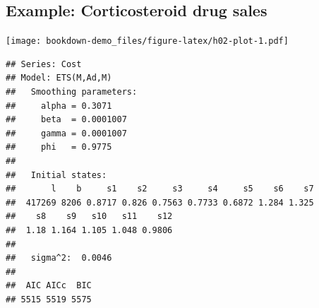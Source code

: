 \documentclass[]{book}
\newenvironment{Shaded}{\begin{snugshade}}{\end{snugshade}}
\newcommand{\DataTypeTok}[1]{\textcolor[rgb]{0.13,0.29,0.53}{#1}}
\newcommand{\KeywordTok}[1]{\textcolor[rgb]{0.13,0.29,0.53}{\textbf{#1}}}
\newcommand{\NormalTok}[1]{#1}
\newcommand{\OperatorTok}[1]{\textcolor[rgb]{0.81,0.36,0.00}{\textbf{#1}}}
\newcommand{\StringTok}[1]{\textcolor[rgb]{0.31,0.60,0.02}{#1}}
\begin{document}
\newpage

\hypertarget{example-corticosteroid-drug-sales}{%
\subsection{Example: Corticosteroid drug sales}\label{example-corticosteroid-drug-sales}}

\begin{Shaded}
\end{Shaded}

\texttt{[image: bookdown-demo\_files/figure-latex/h02-plot-1.pdf]}

\begin{Shaded}
\end{Shaded}

\begin{verbatim}
## Series: Cost 
## Model: ETS(M,Ad,M) 
##   Smoothing parameters:
##     alpha = 0.3071 
##     beta  = 0.0001007 
##     gamma = 0.0001007 
##     phi   = 0.9775 
## 
##   Initial states:
##       l    b     s1    s2     s3     s4     s5    s6    s7
##  417269 8206 0.8717 0.826 0.7563 0.7733 0.6872 1.284 1.325
##    s8    s9   s10   s11    s12
##  1.18 1.164 1.105 1.048 0.9806
## 
##   sigma^2:  0.0046
## 
##  AIC AICc  BIC 
## 5515 5519 5575
\end{verbatim}

\begin{Shaded}
\end{Shaded}
\end{document}
